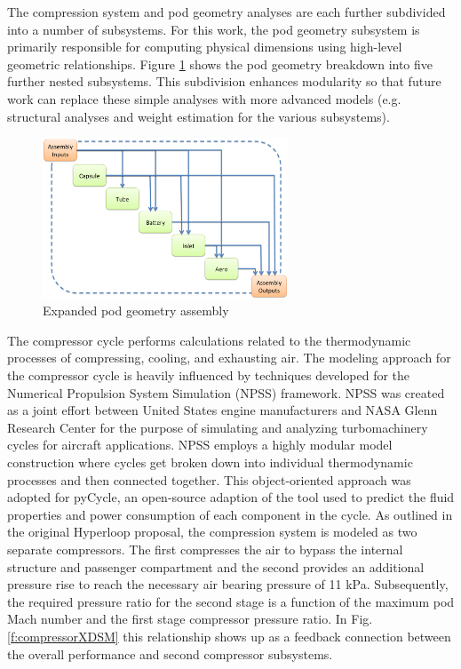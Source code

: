 \documentclass[heading.tex]{subfiles}
\begin{document}
The compression system and pod geometry analyses are each further subdivided into a number of subsystems. For this work, the pod geometry 
subsystem is primarily responsible for computing physical dimensions using high-level geometric relationships.
 Figure \ref{f:podXDSM} shows the pod geometry breakdown into five further nested subsystems.
This subdivision enhances modularity so that future work can replace these simple analyses with more advanced models
(e.g. structural analyses and weight estimation for the various subsystems).

\begin{figure}[hbtp]
\centering
\includegraphics[width=0.65\textwidth]{images/podAssembly.png}
\caption{Expanded pod geometry assembly}
\label{f:podXDSM}
\end{figure}

The compressor cycle performs calculations related to the thermodynamic processes of compressing, cooling, and exhausting air. 
The modeling approach for the compressor cycle is heavily influenced by
techniques developed for the Numerical Propulsion System Simulation (NPSS) framework. 
NPSS was created as a joint effort between United States engine manufacturers and NASA Glenn Research Center for the purpose of 
simulating and analyzing turbomachinery cycles for aircraft applications\cite{Lytle}. NPSS employs a highly modular model construction
where cycles get broken down into individual thermodynamic processes and then connected together. 
This object-oriented approach was adopted for pyCycle,
an open-source adaption of the tool used to predict the fluid properties and power consumption of each component in the cycle. 
As outlined in the original Hyperloop proposal, the compression system is modeled as two separate compressors.
The first compresses the air to bypass the internal structure and passenger compartment
and the second provides an additional pressure rise to reach the necessary air bearing pressure of 11 kPa. 
Subsequently, the required pressure ratio for the second stage is a function of the maximum pod Mach number
and the first stage compressor pressure ratio.
In Fig. \ref{f:compressorXDSM} this relationship shows up as a feedback connection between
the overall performance and second compressor subsystems. 
\end{document}
